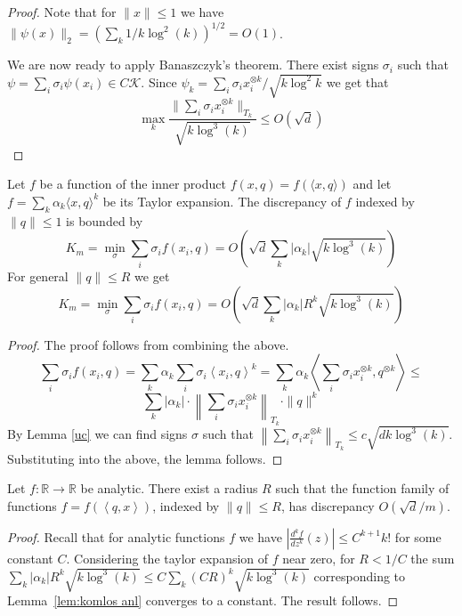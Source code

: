 \documentclass[anon,12pt]{colt2019} %
\newcommand{\ip}[1]{\left \langle #1 \right \rangle}
\newcommand{\R}{\mathbb{R}}
\begin{document}
\begin{proof}
\noindent Note that for $\|x\| \le 1$ we have $\|\psi(x)\|_2 = (\sum_k  1/k\log^2(k))^{1/2} = O(1)$.


We are now ready to apply Banaszczyk's theorem. 
There exist signs $\sigma_i$ such that $\psi  = \sum_i \sigma_i \psi(x_i) \in C \mathcal K$.
Since $\psi_k = \sum_i \sigma_i x_i^{\otimes k}/\sqrt{k \log^2{k}}$ we get that 
$$\max_k \frac{\|\sum_i \sigma_i  x_i^{\otimes k}\|_{T_k}}{\sqrt{k \log^{3}(k)}} \le O\left( \sqrt{d} \right)$$
\end{proof}

\begin{lemma} \label{lem:komlos anl}
Let $f$ be a function of the inner product $f(x,q) = f(\langle x,q\rangle)$ and let $f = \sum_k \alpha_k \langle x,q\rangle^k$ be its Taylor expansion. 
The discrepancy of $f$ indexed by $\|q\| \leq 1$ is bounded by
\[
K_m = \min_\sigma \sum_i \sigma_i f(x_i,q) =O\left( \sqrt{d} \sum_k  |\alpha_k|\sqrt{k\log^3(k)}\right)
\]
For general $\|q\| \leq R$ we get
\[
K_m = \min_\sigma \sum_i \sigma_i f(x_i,q) =O\left( \sqrt{d} \sum_k  |\alpha_k| R^k \sqrt{ k\log^3(k)}\right)
\]
\end{lemma}
\begin{proof}
The proof follows from combining the above.
$$
\sum_i \sigma_i f(x_i,q) = \sum_k \alpha_k \sum_i \sigma_i \ip{ x_i,q}^k =  \sum_k \alpha_k  \ip{  \sum_i \sigma_i x_i^{\otimes k},q^{\otimes k}} \le $$
$$\sum_k |\alpha_k| \cdot \left\| \sum_i \sigma_i x_i^{\otimes k}\right\|_{T_k} \cdot \|q\|^k
$$
By Lemma \ref{uc} we can find signs $\sigma$ such that 
$\left\| \sum_i \sigma_i x_i^{\otimes k}\right\|_{T_k} \le c\sqrt{d k \log^3(k)}$. Substituting into the above, the lemma follows.
\end{proof}

\begin{theorem}\label{analitic1}
Let $f:\R\rightarrow\R$ be analytic. There exist a radius $R$ such that the function family of functions $f = f(\ip{q,x})$, indexed by $\|q\| \leq R$, has discrepancy $O(\sqrt{d}/m)$. 
\end{theorem}
\begin{proof}
Recall that for analytic functions $f$ we have $\left| \frac{d^k f}{dz^k}(z) \right|  \leq C^{k+1} k! $
for some constant $C$. Considering the taylor expansion of $f$ near zero, for $R < 1/C$ the sum
$ \sum_k  |\alpha_k| R^k \sqrt{ k\log^3(k)} \leq C \sum_k  (CR)^k \sqrt{ k\log^3(k)}$
corresponding to Lemma~\ref{lem:komlos anl} converges to a constant. The result follows.
\end{proof}
\end{document}
